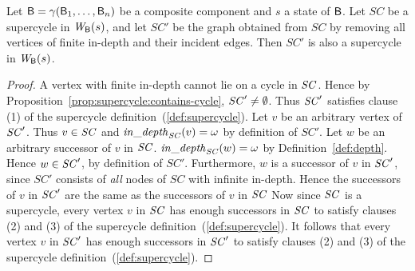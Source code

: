\begin{proposition} \label{prop:supercycle:essential-subgraph-of} Let $\mathsf{B} =
\gamma(\mathsf{B}_1,\dots,\mathsf{B}_n)$ be a composite component and $s$ a state of
$\mathsf{B}$.  Let $SC$ be a supercycle in $\mathit{W}_{\mathsf{B}}({s})$, and let $SC'$ be the
graph obtained from $SC$ by removing all vertices of finite in-depth
and their incident edges. Then $SC'$ is also a supercycle in
$\mathit{W}_{\mathsf{B}}({s})$. 
\end{proposition} 
%
\begin{proof}
A vertex with finite in-depth cannot lie on a cycle in $\mathit{SC}$.  Hence
by Proposition~\ref{prop:supercycle:contains-cycle}, $\mathit{SC}' \neq
\emptyset$. Thus $\mathit{SC}'$ satisfies clause (1) of the supercycle
definition~(\ref{def:supercycle}).
%
Let $v$ be an arbitrary vertex of $\mathit{SC}'$.  Thus $v \in \mathit{SC}$ and $\mathit{in\_depth}_{\mathit{SC}}({v}) = \omega$ by definition of $SC'$. Let
$w$ be an arbitrary successor of $v$ in $\mathit{SC}$. $\mathit{in\_depth}_{\mathit{SC}}({w}) = \omega$ by Definition~\ref{def:depth}. Hence
$w \in \mathit{SC}'$, by definition of $SC'$.  Furthermore, $w$ is a successor of $v$ in $\mathit{SC}'$, since $SC'$ consists of
\emph{all} nodes of $SC$ with infinite in-depth. Hence the successors of $v$ in $\mathit{SC}'$ are
the same as the successors of $v$ in $\mathit{SC}$
%
%
Now since $\mathit{SC}$ is a supercycle, every vertex $v$ in $\mathit{SC}$ has enough successors in $\mathit{SC}$ to satisfy clauses (2) and (3)
of the supercycle definition~(\ref{def:supercycle}). It follows that every vertex $v$ in $\mathit{SC}'$ has enough successors in
$\mathit{SC}'$ to satisfy clauses (2) and (3) of the supercycle definition~(\ref{def:supercycle}).  
\end{proof}
